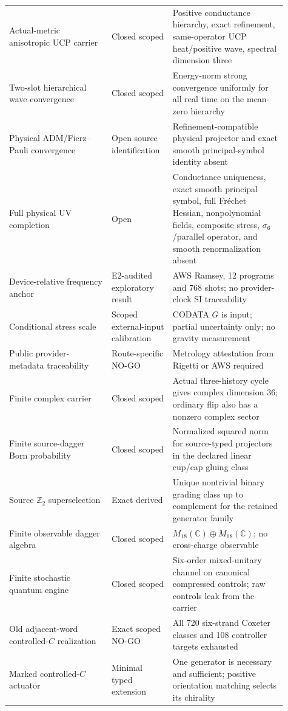 \documentclass[11pt]{article}
\theoremstyle{definition}
\theoremstyle{remark}
\begin{document}
\begin{longtable}{>{\raggedright\arraybackslash}p{0.34\linewidth} >{\raggedright\arraybackslash}p{0.19\linewidth} >{\raggedright\arraybackslash}p{0.38\linewidth}}
Actual-metric anisotropic UCP carrier & Closed scoped & Positive conductance hierarchy, exact refinement, same-operator UCP heat/positive wave, spectral dimension three \\
Two-slot hierarchical wave convergence & Closed scoped & Energy-norm strong convergence uniformly for all real time on the mean-zero hierarchy \\
Physical ADM/Fierz--Pauli convergence & Open source identification & Refinement-compatible physical projector and exact smooth principal-symbol identity absent \\
Full physical UV completion & Open & Conductance uniqueness, exact smooth principal symbol, full Fr\'echet Hessian, nonpolynomial fields, composite stress, $\sigma_6$/parallel operator, and smooth renormalization absent \\
Device-relative frequency anchor & E2-audited exploratory result & AWS Ramsey, 12 programs and 768 shots; no provider-clock SI traceability \\
Conditional stress scale & Scoped external-input calibration & CODATA $G$ is input; partial uncertainty only; no gravity measurement \\
Public provider-metadata traceability & Route-specific NO-GO & Metrology attestation from Rigetti or AWS required \\
Finite complex carrier & Closed scoped & Actual three-history cycle gives complex dimension 36; ordinary flip also has a nonzero complex sector \\
Finite source-dagger Born probability & Closed scoped & Normalized squared norm for source-typed projectors in the declared linear cup/cap gluing class \\
Source $\mathbb Z_2$ superselection & Exact derived & Unique nontrivial binary grading class up to complement for the retained generator family \\
Finite observable dagger algebra & Closed scoped & $M_{18}(\mathbb C)\oplus M_{18}(\mathbb C)$; no cross-charge observable \\
Finite stochastic quantum engine & Closed scoped & Six-order mixed-unitary channel on canonical compressed controls; raw controls leak from the carrier \\
Old adjacent-word controlled-$C$ realization & Exact scoped NO-GO & All 720 six-strand Coxeter classes and 108 controller targets exhausted \\
Marked controlled-$C$ actuator & Minimal typed extension & One generator is necessary and sufficient; positive orientation matching selects its chirality \\

\end{longtable}
\end{document}

